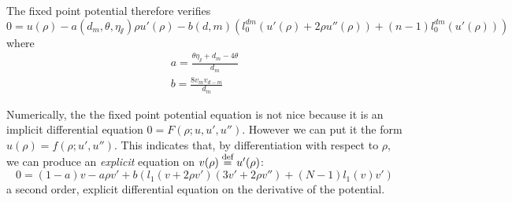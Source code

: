 The fixed point potential therefore verifies
\begin{equation}
0 = u(\rho) - a(d_m, \theta, \eta_\sslash) \rho u'(\rho) - b(d, m) 
\left( l_0^{dm}\left( u'(\rho) + 2 \rho u''(\rho) \right) + (n-1)l_0^{dm}\left( u'(\rho) \right) \right) 
\end{equation}
where 
\begin{align}
a = \frac{\theta \eta_\sslash + d_m - 4 \theta}{d_m} \\
b = \frac{8 v_m v_{d-m}}{d_m}
\end{align}

Numerically, the the fixed point potential equation is not nice because it is an implicit differential equation
$0 = F(\rho ; u, u', u'')$.
However we can put it the form
$u(\rho) = f(\rho; u', u'')$.
This indicates that, by differentiation with respect to $\rho$, we can produce an \textit{explicit} equation on $v(\rho)  \overset{\text{def}}{=}  u'(\rho)$:
\begin{equation}
0 = (1-a) v - a \rho v' + b \left( l_1\left(v+2\rho v'\right)\left(3v'+2\rho v''\right) + (N-1)l_1\left(v\right)v' \right)
\end{equation}
a second order, explicit differential equation on the derivative of the potential.